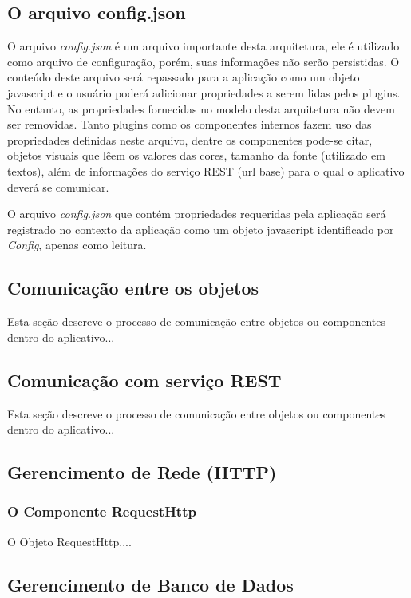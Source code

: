 \subsection{O arquivo config.json}\label{sec:solucao-desenvolvida}
O arquivo \textit{config.json} é um arquivo importante desta arquitetura, ele é utilizado como arquivo de configuração, porém, suas informações não serão persistidas. O conteúdo deste arquivo será repassado para a aplicação como um objeto javascript e o usuário poderá adicionar propriedades a serem lidas pelos plugins. No entanto, as propriedades fornecidas no modelo desta arquitetura não devem ser removidas. Tanto plugins como os componentes internos fazem uso das propriedades definidas neste arquivo, dentre os componentes pode-se citar, objetos visuais que lêem os valores das cores, tamanho da fonte (utilizado em textos), além de informações do serviço REST (url base) para o qual o aplicativo deverá se comunicar.


O arquivo \textit{config.json} que contém propriedades requeridas pela aplicação será registrado no contexto da aplicação como um objeto javascript identificado por \textit{Config}, apenas como leitura.

\subsection{Comunicação entre os objetos}
Esta seção descreve o processo de comunicação entre objetos ou componentes dentro do aplicativo...


\subsection{Comunicação com serviço REST}
Esta seção descreve o processo de comunicação entre objetos ou componentes dentro do aplicativo...


\subsection{Gerencimento de Rede (HTTP)}\label{sec:solucao-desenvolvida}
\subsubsection{O Componente RequestHttp}\label{sec:solucao-desenvolvida}
O Objeto RequestHttp....


\subsection{Gerencimento de Banco de Dados}\label{sec:solucao-desenvolvida}
